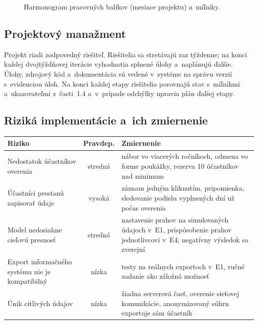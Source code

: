 \documentclass[11pt,a4paper]{article}
\begin{document}
\begin{figure}[htb]
\centering
{}
\caption{Harmonogram pracovných balíkov (mesiace projektu) a~míľniky.}
\label{f:gantt}
\end{figure}

\subsection{Projektový manažment}

Projekt riadi zodpovedný riešiteľ. Riešitelia sa stretávajú raz týždenne;
na konci každej dvojtýždňovej iterácie vyhodnotia splnené úlohy
a~naplánujú ďalšie. Úlohy, zdrojový kód a~dokumentácia sú vedené
v~systéme na správu verzií s~evidenciou úloh. Na konci každej etapy
riešitelia porovnajú stav s~míľnikmi a~ukazovateľmi z~časti~1.4 a~v~prípade
odchýlky upravia plán ďalšej etapy.

\subsection{Riziká implementácie a~ich zmiernenie}

\begin{center}
\small
\begin{tabularx}{\linewidth}{@{}>{\raggedright\arraybackslash}p{45mm}cX@{}}
\toprule
\textbf{Riziko} & \textbf{Pravdep.} & \textbf{Zmiernenie} \\
\midrule
Nedostatok účastníkov overenia & stredná
  & nábor vo viacerých ročníkoch, odmena vo forme poukážky, rezerva 10
    účastníkov nad minimum \\
Účastníci prestanú zapisovať údaje & vysoká
  & záznam jedným kliknutím, pripomienka, sledovanie podielu vyplnených dní
    už počas overenia \\
Model nedosiahne cieľovú presnosť & stredná
  & nastavenie prahov na simulovaných údajoch v~E1, prispôsobenie prahov
    jednotlivcovi v~E4; negatívny výsledok sa zverejní \\
Export informačného systému nie je kompatibilný & nízka
  & testy na reálnych exportoch v~E1, ručné zadanie ako záložná možnosť \\
Únik citlivých údajov & nízka
  & žiadna serverová časť, overenie sieťovej komunikácie, anonymizovaný
    súhrn exportuje sám účastník \\
\bottomrule
\end{tabularx}
\end{center}
\end{document}
